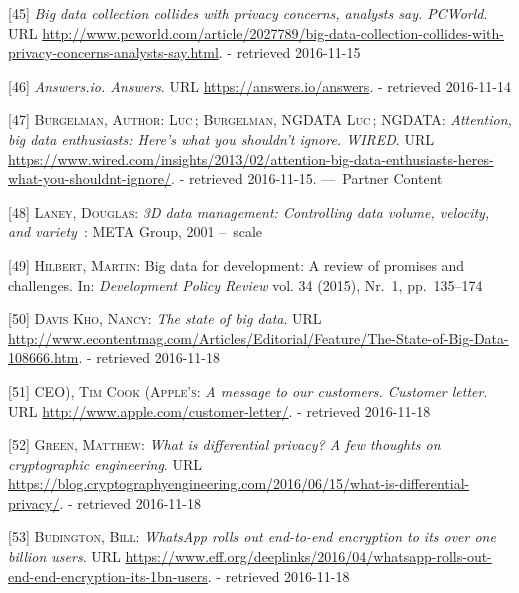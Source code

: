 \documentclass[12pt,english,a4paper,titlepage,cleardoublepage=empty,dottedtoc]{report}
\begin{document}
\hypertarget{ref-web_2013_big-data-collection-collides-with-privacy-concerns}{}
{[}45{]} \emph{Big data collection collides with privacy concerns,
analysts say. PCWorld}. URL
\url{http://www.pcworld.com/article/2027789/big-data-collection-collides-with-privacy-concerns-analysts-say.html}.
- retrieved 2016-11-15

\hypertarget{ref-web_2016_answers-io}{}
{[}46{]} \emph{Answers.io. Answers}. URL
\url{https://answers.io/answers}. - retrieved 2016-11-14

\hypertarget{ref-web_2016_big-data-enthusiasts-should-not-ignore}{}
{[}47{]} \textsc{Burgelman, Author: Luc}\,; \textsc{Burgelman, NGDATA
Luc}\,; \textsc{NGDATA}: \emph{Attention, big data enthusiasts: Here's
what you shouldn't ignore. WIRED}. URL
\url{https://www.wired.com/insights/2013/02/attention-big-data-enthusiasts-heres-what-you-shouldnt-ignore/}.
- retrieved 2016-11-15. ---~Partner Content

\hypertarget{ref-report_2001_3d-data-management-controlling-data-volume-velocity-and-variety}{}
{[}48{]} \textsc{Laney, Douglas}: \emph{3D data management: Controlling
data volume, velocity, and variety}~: META Group, 2001 --~scale

\hypertarget{ref-paper_2015_big-data-for-development-a-review-of-promises-and-challenges:more-data}{}
{[}49{]} \textsc{Hilbert, Martin}: Big data for development: A review of
promises and challenges. In: \emph{Development Policy Review} vol. 34
(2015), Nr.~1, pp.~135--174

\hypertarget{ref-web_2016_the-state-of-big-data}{}
{[}50{]} \textsc{Davis Kho, Nancy}: \emph{The state of big data}. URL
\url{http://www.econtentmag.com/Articles/Editorial/Feature/The-State-of-Big-Data-108666.htm}.
- retrieved 2016-11-18

\hypertarget{ref-web_2016_apple_customer-letter}{}
{[}51{]} \textsc{CEO), Tim Cook (Apple's}: \emph{A message to our
customers. Customer letter}. URL
\url{http://www.apple.com/customer-letter/}. - retrieved 2016-11-18

\hypertarget{ref-web_2016_what-is-differential-privacy}{}
{[}52{]} \textsc{Green, Matthew}: \emph{What is differential privacy? A
few thoughts on cryptographic engineering}. URL
\url{https://blog.cryptographyengineering.com/2016/06/15/what-is-differential-privacy/}.
- retrieved 2016-11-18

\hypertarget{ref-web_2016_eff_whatsapp-rolls-out-emd-to-end-encryption}{}
{[}53{]} \textsc{Budington, Bill}: \emph{WhatsApp rolls out end-to-end
encryption to its over one billion users}. URL
\url{https://www.eff.org/deeplinks/2016/04/whatsapp-rolls-out-end-end-encryption-its-1bn-users}.
- retrieved 2016-11-18
\end{document}
